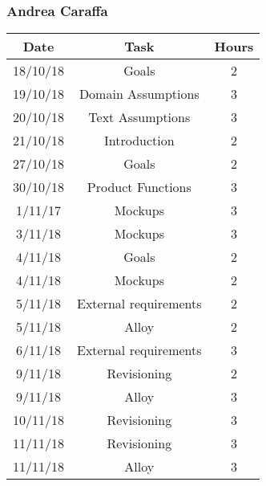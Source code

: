 \subsubsection{Andrea Caraffa}
\begin{table}[h]
\centering
\begin{tabular}{|c|c|c|}
\hline
\rowcolor[HTML]{FE996B} 
Date & Task & Hours 
\\ \hline
\rowcolor[HTML]{FFFC9E} 
18/10/18  & Goals & 2
\\ \hline
\rowcolor[HTML]{FFFC9E} 
19/10/18 & Domain Assumptions & 3 
\\ \hline
\rowcolor[HTML]{FFFC9E}
20/10/18 & Text Assumptions & 3
\\ \hline
\rowcolor[HTML]{FFFC9E}
21/10/18 & Introduction & 2
\\ \hline
\rowcolor[HTML]{FFFC9E}
27/10/18 & Goals & 2
\\ \hline
\rowcolor[HTML]{FFFC9E}
30/10/18 & Product Functions & 3
\\ \hline
\rowcolor[HTML]{FFFC9E}
1/11/17 & Mockups & 3
\\ \hline
\rowcolor[HTML]{FFFC9E}
3/11/18 & Mockups & 3
\\ \hline
\rowcolor[HTML]{FFFC9E}
4/11/18 & Goals & 2
\\ \hline
\rowcolor[HTML]{FFFC9E}
4/11/18 & Mockups & 2
\\ \hline
\rowcolor[HTML]{FFFC9E}
5/11/18 & External requirements & 2
\\ \hline
\rowcolor[HTML]{FFFC9E}
5/11/18 & Alloy & 2
\\ \hline
\rowcolor[HTML]{FFFC9E}
6/11/18 & External requirements & 3
\\ \hline
\rowcolor[HTML]{FFFC9E}
9/11/18 & Revisioning  & 2
\\ \hline
\rowcolor[HTML]{FFFC9E}
9/11/18 & Alloy  & 3
\\ \hline
\rowcolor[HTML]{FFFC9E}
10/11/18 & Revisioning & 3
\\ \hline
\rowcolor[HTML]{FFFC9E}
11/11/18 & Revisioning & 3
\\ \hline
\rowcolor[HTML]{FFFC9E}
11/11/18 & Alloy & 3
\\ \hline



\end{tabular}
\end{table}
